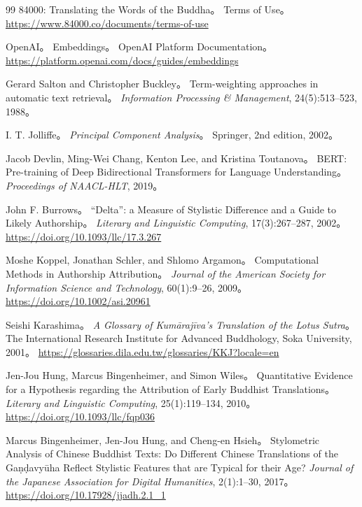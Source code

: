 \documentclass[uplatex,dvipdfmx,11pt,a4paper]{jsarticle}
\begin{document}
\begin{thebibliography}{99}
84000: Translating the Words of the Buddha。
\newblock Terms of Use。
\newblock \url{https://www.84000.co/documents/terms-of-use}

OpenAI。
\newblock Embeddings。
\newblock OpenAI Platform Documentation。
\newblock \url{https://platform.openai.com/docs/guides/embeddings}

Gerard Salton and Christopher Buckley。
\newblock Term-weighting approaches in automatic text retrieval。
\newblock \textit{Information Processing \& Management}, 24(5):513--523, 1988。

I. T. Jolliffe。
\newblock \textit{Principal Component Analysis}。
\newblock Springer, 2nd edition, 2002。

Jacob Devlin, Ming-Wei Chang, Kenton Lee, and Kristina Toutanova。
\newblock BERT: Pre-training of Deep Bidirectional Transformers for Language Understanding。
\newblock \textit{Proceedings of NAACL-HLT}, 2019。

John F. Burrows。
\newblock ``Delta'': a Measure of Stylistic Difference and a Guide to Likely Authorship。
\newblock \textit{Literary and Linguistic Computing}, 17(3):267--287, 2002。
\newblock \url{https://doi.org/10.1093/llc/17.3.267}

Moshe Koppel, Jonathan Schler, and Shlomo Argamon。
\newblock Computational Methods in Authorship Attribution。
\newblock \textit{Journal of the American Society for Information Science and Technology}, 60(1):9--26, 2009。
\newblock \url{https://doi.org/10.1002/asi.20961}

Seishi Karashima。
\newblock \textit{A Glossary of Kumārajīva's Translation of the Lotus Sutra}。
\newblock The International Research Institute for Advanced Buddhology, Soka University, 2001。
\newblock \url{https://glossaries.dila.edu.tw/glossaries/KKJ?locale=en}

Jen-Jou Hung, Marcus Bingenheimer, and Simon Wiles。
\newblock Quantitative Evidence for a Hypothesis regarding the Attribution of Early Buddhist Translations。
\newblock \textit{Literary and Linguistic Computing}, 25(1):119--134, 2010。
\newblock \url{https://doi.org/10.1093/llc/fqp036}

Marcus Bingenheimer, Jen-Jou Hung, and Cheng-en Hsieh。
\newblock Stylometric Analysis of Chinese Buddhist Texts: Do Different Chinese Translations of the Gaṇḍavyūha Reflect Stylistic Features that are Typical for their Age?
\newblock \textit{Journal of the Japanese Association for Digital Humanities}, 2(1):1--30, 2017。
\newblock \url{https://doi.org/10.17928/jjadh.2.1_1}


\end{thebibliography}
\end{document}
